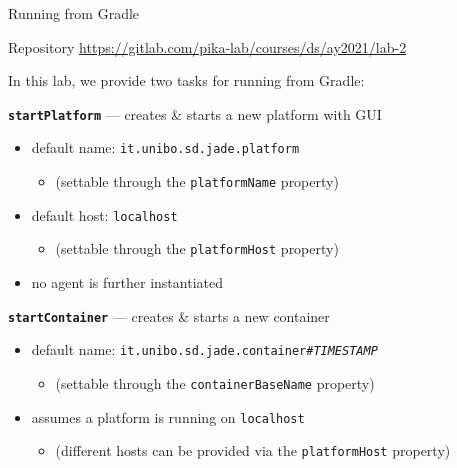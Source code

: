 \documentclass{beamer}\mode<presentation>{\usetheme{AMSCesenaPurpleAndGold}}
\begin{document}
\begin{frame}[allowframebreaks]{Running \jade{} from Gradle}
	
	\begin{block}{Repository}\centering
		\url{https://gitlab.com/pika-lab/courses/ds/ay2021/lab-2}
	\end{block}

	\bigskip

    In this lab, we provide two tasks for running \jade{} from Gradle:
    \medskip
    \begin{block}{\textbf{\texttt{startPlatform}} --- creates \& starts a new platform with GUI}
        \begin{itemize}
            \item default name: \texttt{it.unibo.sd.jade.platform}
            \begin{itemize}
                \item (settable through the \texttt{platformName} property)
            \end{itemize}

            \item default host: \texttt{localhost}
            \begin{itemize}
                \item (settable through the \texttt{platformHost} property)
            \end{itemize}

            \item \alert{no agent} is further instantiated
        \end{itemize}
    \end{block}

    \begin{block}{\textbf{\texttt{startContainer}} --- creates \& starts a new container}
        \begin{itemize}

            \item default name: \texttt{it.unibo.sd.jade.container\#\textit{TIMESTAMP}}
            \begin{itemize}
                \item (settable through the \texttt{containerBaseName} property)
            \end{itemize}

            \item assumes a platform is running on \texttt{localhost}
            \begin{itemize}
                \item (different hosts can be provided via the \texttt{platformHost} property)
            \end{itemize}


\end{itemize}
\end{block}
\end{frame}
\end{document}

